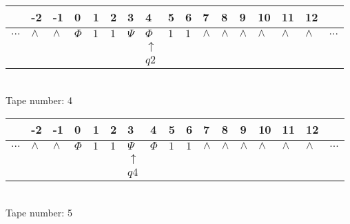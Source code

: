 \documentclass{article}
\begin{document}
\begin{table}[H]
\centering
\begin{tabular}{lllllllllllllllll}
 & -2 & -1 & 0 & 1 & 2 & 3 & 4 & 5 & 6 & 7 & 8 & 9 & 10 & 11 & 12 & \\
\hline
$...$ & \multicolumn{1}{|l|}{$\wedge$} & \multicolumn{1}{|l|}{$\wedge$} & \multicolumn{1}{|l|}{$\Phi$} & \multicolumn{1}{|l|}{$1$} & \multicolumn{1}{|l|}{$1$} & \multicolumn{1}{|l|}{$\Psi$} & \multicolumn{1}{|l|}{$\Phi$} & \multicolumn{1}{|l|}{$1$} & \multicolumn{1}{|l|}{$1$} & \multicolumn{1}{|l|}{$\wedge$} & \multicolumn{1}{|l|}{$\wedge$} & \multicolumn{1}{|l|}{$\wedge$} & \multicolumn{1}{|l|}{$\wedge$} & \multicolumn{1}{|l|}{$\wedge$} & \multicolumn{1}{|l|}{$\wedge$} & $...$\\
\hline
&  &  &  &  &  &  & $\uparrow$ &  &  &  &  &  &  &  &  &  \\
&  &  &  &  &  &  & $ q2 $ &  &  &  &  &  &  &  &  &  \\
\end{tabular}
\\
Tape number: 4
\noindent\makebox[\linewidth]{\hdashrule{\textwidth}{1pt}{1pt}}\end{table}

\begin{table}[H]
\centering
\begin{tabular}{lllllllllllllllll}
 & -2 & -1 & 0 & 1 & 2 & 3 & 4 & 5 & 6 & 7 & 8 & 9 & 10 & 11 & 12 & \\
\hline
$...$ & \multicolumn{1}{|l|}{$\wedge$} & \multicolumn{1}{|l|}{$\wedge$} & \multicolumn{1}{|l|}{$\Phi$} & \multicolumn{1}{|l|}{$1$} & \multicolumn{1}{|l|}{$1$} & \multicolumn{1}{|l|}{$\Psi$} & \multicolumn{1}{|l|}{$\Phi$} & \multicolumn{1}{|l|}{$1$} & \multicolumn{1}{|l|}{$1$} & \multicolumn{1}{|l|}{$\wedge$} & \multicolumn{1}{|l|}{$\wedge$} & \multicolumn{1}{|l|}{$\wedge$} & \multicolumn{1}{|l|}{$\wedge$} & \multicolumn{1}{|l|}{$\wedge$} & \multicolumn{1}{|l|}{$\wedge$} & $...$\\
\hline
&  &  &  &  &  & $\uparrow$ &  &  &  &  &  &  &  &  &  &  \\
&  &  &  &  &  & $ q4 $ &  &  &  &  &  &  &  &  &  &  \\
\end{tabular}
\\
Tape number: 5
\noindent\makebox[\linewidth]{\hdashrule{\textwidth}{1pt}{1pt}}\end{table}
\clearpage
\end{document}
